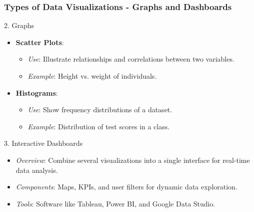 \documentclass{beamer}
\begin{document}
\begin{frame}[fragile]
    \frametitle{Types of Data Visualizations - Graphs and Dashboards}
    \begin{block}{2. Graphs}
        \begin{itemize}
            \item \textbf{Scatter Plots}:
                \begin{itemize}
                    \item \textit{Use}: Illustrate relationships and correlations between two variables.
                    \item \textit{Example}: Height vs. weight of individuals.
                \end{itemize}
            \item \textbf{Histograms}:
                \begin{itemize}
                    \item \textit{Use}: Show frequency distributions of a dataset.
                    \item \textit{Example}: Distribution of test scores in a class.
                \end{itemize}
        \end{itemize}
    \end{block}

    \begin{block}{3. Interactive Dashboards}
        \begin{itemize}
            \item \textit{Overview}: Combine several visualizations into a single interface for real-time data analysis.
            \item \textit{Components}: Maps, KPIs, and user filters for dynamic data exploration.
            \item \textit{Tools}: Software like Tableau, Power BI, and Google Data Studio.
        \end{itemize}
    \end{block}
\end{frame}
\end{document}
